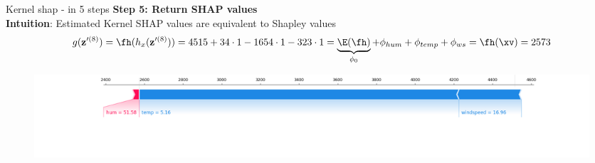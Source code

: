 \documentclass[11pt,compress,t,notes=noshow, aspectratio=169, xcolor=table]{beamer}
\begin{document}
\begin{frame}{Kernel shap - in 5 steps}
\textbf{Step 5: Return SHAP values}\\\medskip
\textbf{Intuition}: Estimated Kernel SHAP values are equivalent to Shapley values 
$$
g(\mathbf{z}^{\prime (8)}) = \fh(h_x(\mathbf{z}^{\prime (8)}) ) = 4515 + 34 \cdot 1 - 1654 \cdot 1 - 323 \cdot 1 = \underbrace{\E(\fh)}_{\phi_0} + \phi_{hum} + \phi_{temp} + \phi_{ws} = \fh(\xv) = 2573
$$

\begin{figure}
    \centering
    \includegraphics[width=\columnwidth]{figure_man/exSHAP.png}
\end{figure}

\end{frame}



\end{document}
